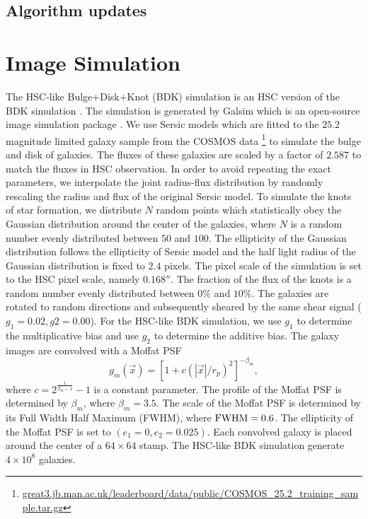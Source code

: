 \documentclass[a4paper,fleqn,usenatbib]{mnras}
\begin{document}
\subsection{Algorithm updates}

\section{Image Simulation}
\label{sec:sim}

The HSC-like Bulge+Disk+Knot (BDK) simulation is an HSC version of the BDK
simulation \citep{metacal2}. The simulation is generated by Galsim which is an
open-source image simulation package \citep{GalSim}. We use Sersic models
\citep{Sersic1963} which are fitted to the $25.2$ magnitude limited galaxy
sample from the COSMOS data
\footnote{\url{great3.jb.man.ac.uk/leaderboard/data/public/COSMOS_25.2_training_sample.tar.gz}}
to simulate the bulge and disk of galaxies. The fluxes of these galaxies are
scaled by a factor of $2.587$ to match the fluxes in HSC observation. In order
to avoid repeating the exact parameters, we interpolate the joint radius-flux
distribution by randomly rescaling the radius and flux of the original Sersic
model. To simulate the knots of star formation, we distribute $N$ random points
which statistically obey the Gaussian distribution around the center of the
galaxies, where $N$ is a random number evenly distributed between $50$ and
$100$. The ellipticity of the Gaussian distribution follows the ellipticity of
Sersic model and the half light radius of the Gaussian distribution is fixed to
$2.4$ pixels. The pixel scale of the simulation is set to the HSC pixel scale,
namely $0.168''$. The fraction of the flux of the knots is a random number
evenly distributed between $0\%$ and $10\%$. The galaxies are rotated to random
directions and subsequently sheared by the same shear signal
($g_1=0.02,g2=0.00$). For the HSC-like BDK simulation, we use $g_1$ to
determine the multiplicative bias and use $g_2$ to determine the additive bias.
The galaxy images are convolved with a Moffat PSF \citep{Moffat1969}
\begin{equation}\label{Moffat PSF}
g_{m}(\vec{x})=[1+c(|\vec{x}|/r_p)^2]^{-\beta_m},  \end{equation} where
$c=2^{\frac{1}{\beta_m-1}}-1$ is a constant parameter. The profile of the
Moffat PSF is determined by $\beta_m$, where $\beta_{m}=3.5$. The scale of the
Moffat PSF is determined by its Full Width Half Maximum (FWHM), where
$\rm{FWHM}=0.6$.  The ellipticity of the Moffat PSF is set to
$(e_1=0,e_2=0.025)$. Each convolved galaxy is placed around the center of a
$64\times 64$ stamp. The HSC-like BDK simulation generate $4\times 10^8$
galaxies.
\end{document}

